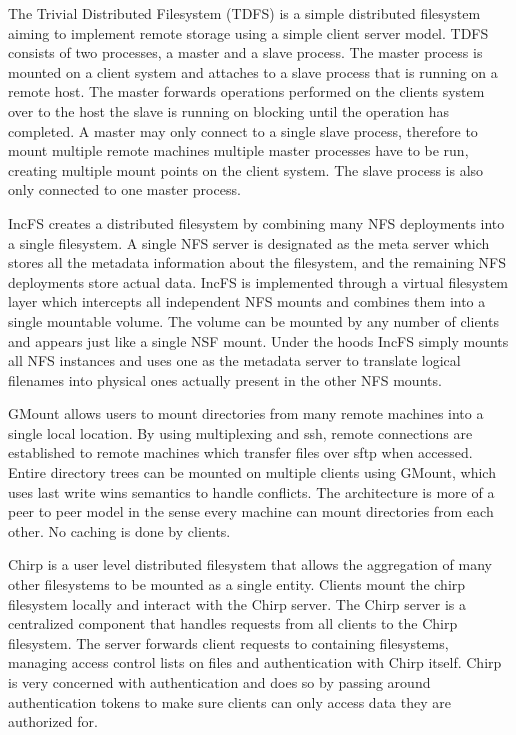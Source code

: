 The Trivial Distributed Filesystem (TDFS) \cite{Voras2006} is a simple
distributed filesystem aiming to implement remote storage using a simple
client server model. TDFS consists of two processes, a master and a slave
process. The master process is mounted on a client system and attaches to a
slave process that is running on a remote host. The master forwards operations
performed on the clients system over to the host the slave is running on
blocking until the operation has completed. A master may only connect to a
single slave process, therefore to mount multiple remote machines multiple
master processes have to be run, creating multiple mount points on the client
system. The slave process is also only connected to one master process.


IncFS \cite{Zhao2006} creates a distributed filesystem by combining many NFS
deployments into a single filesystem. A single NFS server is designated as the
meta server which stores all the metadata information about the filesystem,
and the remaining NFS deployments store actual data. IncFS is implemented
through a virtual filesystem layer which intercepts all independent NFS mounts
and combines them into a single mountable volume. The volume can be mounted by
any number of clients and appears just like a single NSF mount. Under the
hoods IncFS simply mounts all NFS instances and uses one as the metadata
server to translate logical filenames into physical ones actually present in
the other NFS mounts.


GMount \cite{Dun2009} allows users to mount directories from many remote
machines into a single local location. By using multiplexing and ssh, remote
connections are established to remote machines which transfer files over sftp
when accessed. Entire directory trees can be mounted on multiple clients using
GMount, which uses last write wins semantics to handle conflicts. The
architecture is more of a peer to peer model in the sense every machine can
mount directories from each other. No caching is done by clients.


Chirp \cite{Donnelly2012} is a user level distributed filesystem that allows
the aggregation of many other filesystems to be mounted as a single entity.
Clients mount the chirp filesystem locally and interact with the Chirp server.
The Chirp server is a centralized component that handles requests from all
clients to the Chirp filesystem. The server forwards client requests to
containing filesystems, managing access control lists on files and
authentication with Chirp itself. Chirp is very concerned with authentication
and does so by passing around authentication tokens to make sure clients can
only access data they are authorized for.


